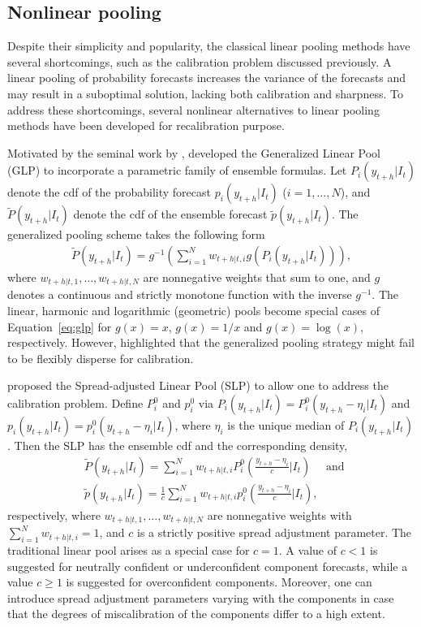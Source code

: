 \documentclass[11pt]{article}
\begin{document}
\subsection{Nonlinear pooling}
\label{sec:nonlinear_pooling}

Despite their simplicity and popularity, the classical linear pooling methods have several shortcomings, such as the calibration problem discussed previously. A linear pooling of probability forecasts increases the variance of the forecasts and may result in a suboptimal solution, lacking both calibration and sharpness. To address these shortcomings, several nonlinear alternatives to linear pooling methods have been developed for recalibration purpose.

Motivated by the seminal work by \cite{Dawid1995-jj}, \cite{Gneiting2013-hl} developed the Generalized Linear Pool (GLP) to incorporate a parametric family of ensemble formulas. Let $P_{i}(y_{t+h}|I_{t})$ denote the cdf of the probability forecast $p_{i}(y_{t+h}|I_{t})$ ($i=1,\ldots,N$), and $\tilde{P}(y_{t+h}|I_{t})$ denote the cdf of the ensemble forecast $\tilde{p}(y_{t+h}|I_{t})$. The generalized pooling scheme takes the following form
\begin{align}
\label{eq:glp}
\tilde{P}(y_{t+h}|I_{t}) = g^{-1}\left(\sum_{i=1}^{N} w_{t+h|t,i} g\left(P_{i}(y_{t+h}|I_{t})\right)\right),
\end{align}
where $w_{t+h|t,1},\ldots,w_{t+h|t,N}$ are nonnegative weights that sum to one, and $g$ denotes a continuous and strictly monotone function with the inverse $g^{-1}$. The linear, harmonic and logarithmic (geometric) pools become special cases of Equation~\eqref{eq:glp} for $g(x)=x$, $g(x)=1/x$ and $g(x)=\log(x)$, respectively. However, \cite{Gneiting2013-hl} highlighted that the generalized pooling strategy might fail to be flexibly disperse for calibration.

\cite{Gneiting2013-hl} proposed the Spread-adjusted Linear Pool (SLP) to allow one to address the calibration problem. Define $P_{i}^{0}$ and $p_{i}^{0}$ via $P_{i}(y_{t+h}|I_{t})=P_{i}^{0}(y_{t+h}-\eta_{i}|I_{t})$ and $p_{i}(y_{t+h}|I_{t})=p_{i}^{0}(y_{t+h}-\eta_{i}|I_{t})$, where $\eta_{i}$ is the unique median of $P_{i}(y_{t+h}|I_{t})$. Then the SLP has the ensemble cdf and the corresponding density,
\begin{align*}
&\tilde{P}(y_{t+h}|I_{t})=\sum_{i=1}^{N} w_{t+h|t,i} P_{i}^{0}\left(\frac{y_{t+h}-\eta_{i}}{c}\bigg|I_{t}\right) \quad \text { and }\\
&\tilde{p}(y_{t+h}|I_{t})=\frac{1}{c} \sum_{i=1}^{N} w_{t+h|t,i} p_{i}^{0}\left(\frac{y_{t+h}-\eta_{i}}{c}\bigg|I_{t}\right),
\end{align*}
respectively, where $w_{t+h|t,1},\ldots,w_{t+h|t,N}$ are nonnegative weights with $\sum_{i=1}^{N}w_{t+h|t,i}=1$, and $c$ is a strictly positive spread adjustment parameter. The traditional linear pool arises as a special case for $c = 1$. A value of $c < 1$ is suggested for neutrally confident or underconfident component forecasts, while a value $c \geq 1$ is suggested for overconfident components. Moreover, one can introduce spread adjustment parameters varying with the components in case that the degrees of miscalibration of the components differ to a high extent.
\end{document}
